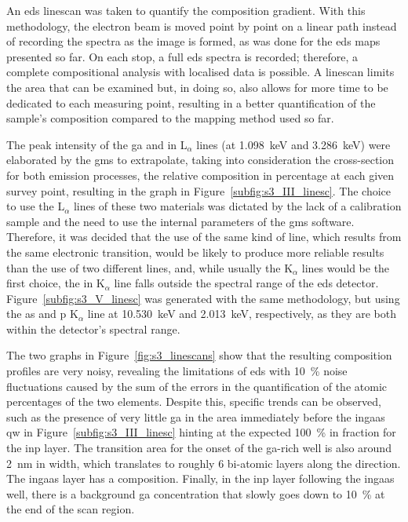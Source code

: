An \acs{eds} linescan was taken to quantify the composition gradient. With this methodology, the electron beam is moved point by point on a linear path instead of recording the spectra as the image is formed, as was done for the \acs{eds} maps presented so far. On each stop, a full \acs{eds} spectra is recorded; therefore, a complete compositional analysis with localised data is possible. A linescan limits the area that can be examined but, in doing so, also allows for more time to be dedicated to each measuring point, resulting in a better quantification of the sample's composition compared to the mapping method used so far.

The peak intensity of the \acl{ga} and \acl{in} L\(_\alpha\) lines (at \qty{1.098}{\kilo\eV} and \qty{3.286}{\kilo\eV}) were elaborated by the \acf{gms} to extrapolate, taking into consideration the cross-section for both emission processes, the relative composition in percentage at each given survey point, resulting in the graph in Figure~\ref{subfig:s3_III_linesc}. The choice to use the L\(_\alpha\) lines of these two materials was dictated by the lack of a calibration sample and the need to use the internal parameters of the \acs{gms} software. Therefore, it was decided that the use of the same kind of line, which results from the same electronic transition, would be likely to produce more reliable results than the use of two different lines, and, while usually the K\(_\alpha\) lines would be the first choice, the \acs{in} K\(_\alpha\) line falls outside the spectral range of the \acs{eds} detector. Figure~\ref{subfig:s3_V_linesc} was generated with the same methodology, but using the \acl{as} and \acl{p} K\(_\alpha\) line at \qty{10.530}{\kilo\eV} and \qty{2.013}{\kilo\eV}, respectively, as they are both within the detector's spectral range.

The two graphs in Figure~\ref{fig:s3_linescans} show that the resulting composition profiles are very noisy, revealing the limitations of \acs{eds} with \qty{10}{\%} noise fluctuations caused by the sum of the errors in the quantification of the atomic percentages of the two elements. Despite this, specific trends can be observed, such as the presence of very little \acl{ga} in the area immediately before the \acs{ingaas} \acl{qw} in Figure~\ref{subfig:s3_III_linesc} hinting at the expected \qty{100}{\%} \acl{in} fraction for the \acs{inp} layer. The transition area for the onset of the \acs{ga}-rich well is also around \qty{2}{nm} in width, which translates to roughly \num{6} bi-atomic layers along the  direction. The \acs{ingaas} layer has a  composition. Finally, in the \acs{inp} layer following the \acs{ingaas} well, there is a background \acl{ga} concentration that slowly goes down to \qty{10}{\%} at the end of the scan region.

